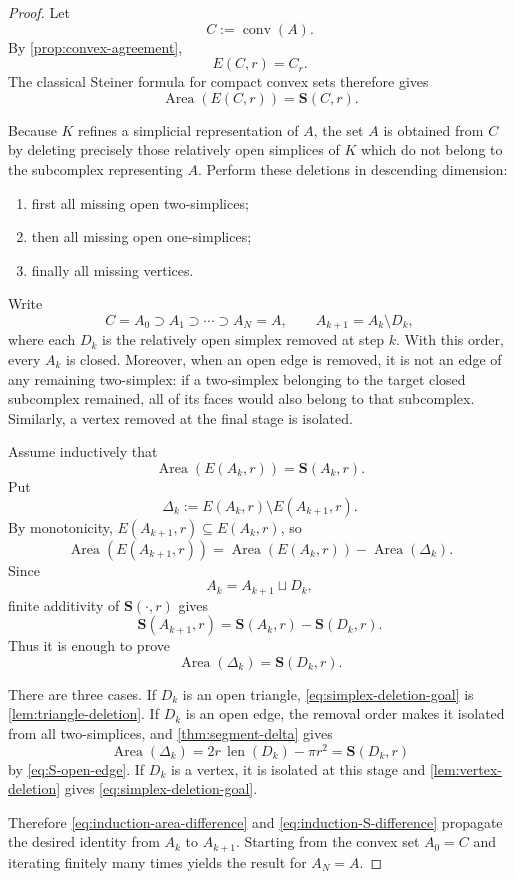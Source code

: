 \documentclass[11pt]{article}
\newcommand{\Area}{\operatorname{Area}}
\newcommand{\len}{\operatorname{len}}
\newcommand{\Steiner}{\mathbf S}
\DeclareMathOperator{\conv}{conv}
\numberwithin{equation}{section}
\begin{document}
\begin{proof}
Let
\[
C:=\conv(A).
\]
By \cref{prop:convex-agreement},
\[
E(C,r)=C_r.
\]
The classical Steiner formula for compact convex sets therefore gives
\[
\Area(E(C,r))=\Steiner(C,r).
\]

Because $K$ refines a simplicial representation of $A$, the set $A$ is obtained from $C$ by deleting precisely those relatively open simplices of $K$ which do not belong to the subcomplex representing $A$. Perform these deletions in descending dimension:
\begin{enumerate}
\item first all missing open two-simplices;
\item then all missing open one-simplices;
\item finally all missing vertices.
\end{enumerate}
Write
\[
C=A_0\supset A_1\supset\cdots\supset A_N=A,
\qquad
A_{k+1}=A_k\setminus D_k,
\]
where each $D_k$ is the relatively open simplex removed at step $k$. With this order, every $A_k$ is closed. Moreover, when an open edge is removed, it is not an edge of any remaining two-simplex: if a two-simplex belonging to the target closed subcomplex remained, all of its faces would also belong to that subcomplex. Similarly, a vertex removed at the final stage is isolated.

Assume inductively that
\[
\Area(E(A_k,r))=\Steiner(A_k,r).
\]
Put
\[
\Delta_k:=E(A_k,r)\setminus E(A_{k+1},r).
\]
By monotonicity, $E(A_{k+1},r)\subseteq E(A_k,r)$, so
\begin{equation}\label{eq:induction-area-difference}
\Area(E(A_{k+1},r))
=
\Area(E(A_k,r))-\Area(\Delta_k).
\end{equation}
Since
\[
A_k=A_{k+1}\sqcup D_k,
\]
finite additivity of $\Steiner(\cdot,r)$ gives
\begin{equation}\label{eq:induction-S-difference}
\Steiner(A_{k+1},r)
=
\Steiner(A_k,r)-\Steiner(D_k,r).
\end{equation}
Thus it is enough to prove
\begin{equation}\label{eq:simplex-deletion-goal}
\Area(\Delta_k)=\Steiner(D_k,r).
\end{equation}

There are three cases. If $D_k$ is an open triangle, \eqref{eq:simplex-deletion-goal} is \cref{lem:triangle-deletion}. If $D_k$ is an open edge, the removal order makes it isolated from all two-simplices, and \cref{thm:segment-delta} gives
\[
\Area(\Delta_k)
=2r\,\len(D_k)-\pi r^2
=\Steiner(D_k,r)
\]
by \eqref{eq:S-open-edge}. If $D_k$ is a vertex, it is isolated at this stage and \cref{lem:vertex-deletion} gives \eqref{eq:simplex-deletion-goal}.

Therefore \eqref{eq:induction-area-difference} and \eqref{eq:induction-S-difference} propagate the desired identity from $A_k$ to $A_{k+1}$. Starting from the convex set $A_0=C$ and iterating finitely many times yields the result for $A_N=A$.
\end{proof}
\end{document}

